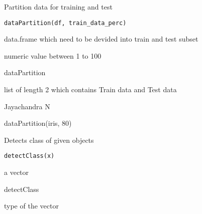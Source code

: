 \documentclass[a4paper]{book}
\begin{document}
%
\begin{Description}\relax
Partition data for training and test
\end{Description}
%
\begin{Usage}
\begin{verbatim}
dataPartition(df, train_data_perc)
\end{verbatim}
\end{Usage}
%
\begin{Arguments}
\begin{ldescription}
\item[\code{df}] data.frame which need to be devided into train and test subset

\item[\code{train\_data\_perc}] numeric value between 1 to 100
\end{ldescription}
\end{Arguments}
%
\begin{Details}\relax
dataPartition
\end{Details}
%
\begin{Value}
list of length 2 which contains Train data and Test data
\end{Value}
%
\begin{Author}\relax
Jayachandra N
\end{Author}
%
\begin{Examples}
\begin{ExampleCode}
dataPartition(iris, 80)
\end{ExampleCode}
\end{Examples}
%
\begin{Description}\relax
Detects class of given objects
\end{Description}
%
\begin{Usage}
\begin{verbatim}
detectClass(x)
\end{verbatim}
\end{Usage}
%
\begin{Arguments}
\begin{ldescription}
\item[\code{x}] a vector
\end{ldescription}
\end{Arguments}
%
\begin{Details}\relax
detectClass
\end{Details}
%
\begin{Value}
type of the vector
\end{Value}
\end{document}
